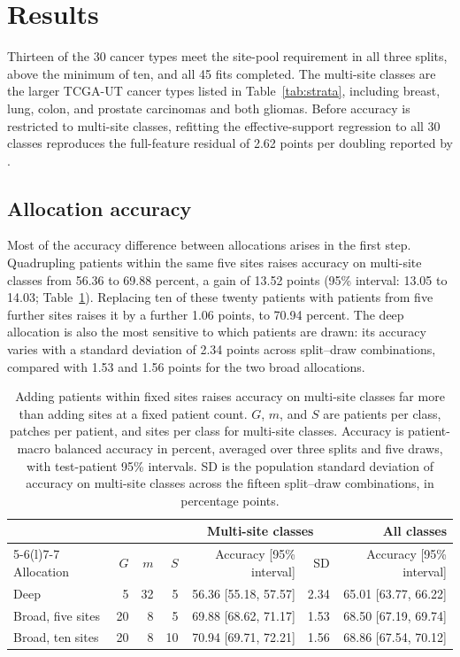 \section{Results}
\label{sec:results}
Thirteen of the 30 cancer types meet the site-pool requirement in all three splits, above the minimum of ten, and all 45 fits completed. The multi-site classes are the larger TCGA-UT cancer types listed in Table~\ref{tab:strata}, including breast, lung, colon, and prostate carcinomas and both gliomas. Before accuracy is restricted to multi-site classes, refitting the effective-support regression to all 30 classes reproduces the full-feature residual of 2.62 points per doubling reported by \citet{queisler2026multidirectionalRedundancy}.

\subsection{Allocation accuracy}
Most of the accuracy difference between allocations arises in the first step. Quadrupling patients within the same five sites raises accuracy on multi-site classes from 56.36 to 69.88 percent, a gain of 13.52 points (95\% interval: 13.05 to 14.03; Table~\ref{tab:allocation-accuracy}). Replacing ten of these twenty patients with patients from five further sites raises it by a further 1.06 points, to 70.94 percent. The deep allocation is also the most sensitive to which patients are drawn: its accuracy varies with a standard deviation of 2.34 points across split--draw combinations, compared with 1.53 and 1.56 points for the two broad allocations.

\begin{table}[htbp]
\centering
\small
\renewcommand{\arraystretch}{1.15}
\begin{tabular}{@{}lrrrrrr@{}}
\toprule
 & & & & \multicolumn{2}{c}{Multi-site classes} & All classes \\
\cmidrule(lr){5-6}\cmidrule(l){7-7}
Allocation & $G$ & $m$ & $S$ & Accuracy [95\% interval] & SD & Accuracy [95\% interval] \\
\midrule
Deep & 5 & 32 & 5 & 56.36 [55.18, 57.57] & 2.34 & 65.01 [63.77, 66.22] \\
Broad, five sites & 20 & 8 & 5 & 69.88 [68.62, 71.17] & 1.53 & 68.50 [67.19, 69.74] \\
Broad, ten sites & 20 & 8 & 10 & 70.94 [69.71, 72.21] & 1.56 & 68.86 [67.54, 70.12] \\
\bottomrule
\end{tabular}
\caption{Adding patients within fixed sites raises accuracy on multi-site classes far more than adding sites at a fixed patient count. $G$, $m$, and $S$ are patients per class, patches per patient, and sites per class for multi-site classes. Accuracy is patient-macro balanced accuracy in percent, averaged over three splits and five draws, with test-patient 95\% intervals. SD is the population standard deviation of accuracy on multi-site classes across the fifteen split--draw combinations, in percentage points.}
\label{tab:allocation-accuracy}
\end{table}


